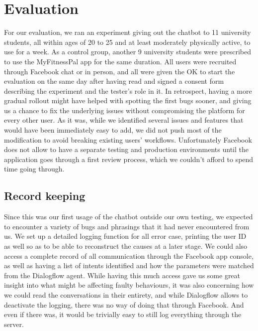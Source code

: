 \section{Evaluation}
For our evaluation, we ran an experiment giving out the chatbot to 11 university students, all within ages of 20 to 25 and at least moderately physically active, to use for a week. As a control group, another 9 university students were prescribed to use the MyFitnessPal app for the same duration. All users were recruited through Facebook chat or in person, and all were given the OK to start the evaluation on the same day after having read and signed a consent form describing the experiment and the tester's role in it. In retrospect, having a more gradual rollout might have helped with spotting the first bugs sooner, and giving us a chance to fix the underlying issues without compromising the platform for every other user. As it was, while we identified several issues and features that would have been immediately easy to add, we did not push most of the modification to avoid breaking existing users' workflows. Unfortunately Facebook does not allow to have a separate testing and production environments until the application goes through a first review process, which we couldn't afford to spend time going through.
\subsection{Record keeping}
Since this was our first usage of the chatbot outside our own testing, we expected to encounter a variety of bugs and phrasings that it had never encountered from us. We set up a detailed logging function for all error case, printing the user ID as well so as to be able to reconstruct the causes at a later stage. We could also access a complete record of all communication through the Facebook app console, as well as having a list of intents identified and how the parameters were matched from the Dialogflow agent. While having this much access gave us some great insight into what might be affecting faulty behaviours, it was also concerning how we could read the conversations in their entirety, and while Dialogflow allows to deactivate the logging, there was no way of doing that through Facebook. And even if there was, it would be trivially easy to still log everything through the server.


